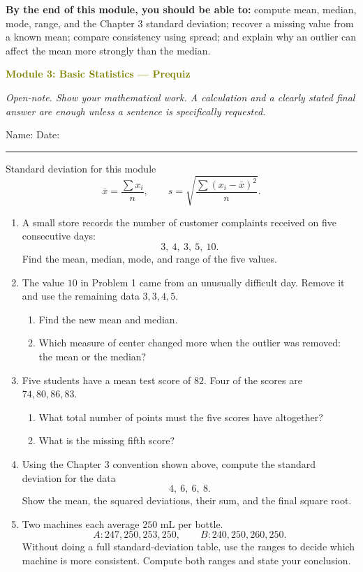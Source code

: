 \documentclass[11pt]{article}
\newcommand{\prequizhead}[2]{%
  \clearpage
  {\Large\bfseries\textcolor{olive}{Module #1: #2 — Prequiz}}\par
  \textit{Open-note. Show your mathematical work. A calculation and a clearly stated final answer are enough unless a sentence is specifically requested.}\par
  Name: \hspace{2.6in} Date: \hspace{1.1in}\par
  \vspace{2pt}\textcolor{gold}{\rule{\linewidth}{1.2pt}}\par\smallskip
}
\newcommand{\worklarge}{\par\vspace{0.92in}}
\newcommand{\workxl}{\par\vspace{1.22in}}
\begin{document}
\textbf{By the end of this module, you should be able to:} compute mean, median, mode, range, and the Chapter 3 standard deviation; recover a missing value from a known mean; compare consistency using spread; and explain why an outlier can affect the mean more strongly than the median.

\prequizhead{3}{Basic Statistics}
\begin{refbox}{Standard deviation for this module}
\[
\bar x=\frac{\sum x_i}{n},
\qquad
s=\sqrt{\frac{\sum (x_i-\bar x)^2}{n}}.
\]
\end{refbox}

\begin{enumerate}
\item A small store records the number of customer complaints received on five consecutive days:
\[
3,\ 4,\ 3,\ 5,\ 10.
\]
Find the mean, median, mode, and range of the five values.
\workxl

\item The value \(10\) in Problem 1 came from an unusually difficult day. Remove it and use the remaining data \(3,3,4,5\).
\begin{enumerate}[label=(\alph*),itemsep=4pt]
\item Find the new mean and median.
\item Which measure of center changed more when the outlier was removed: the mean or the median?
\end{enumerate}
\worklarge

\item Five students have a mean test score of \(82\). Four of the scores are \(74,80,86,83\).
\begin{enumerate}[label=(\alph*),itemsep=4pt]
\item What total number of points must the five scores have altogether?
\item What is the missing fifth score?
\end{enumerate}
\worklarge

\item Using the Chapter 3 convention shown above, compute the standard deviation for the data
\[
4,\ 6,\ 6,\ 8.
\]
Show the mean, the squared deviations, their sum, and the final square root.
\workxl

\item Two machines each average \(250\) mL per bottle.
\[
A:247,250,253,250,
\qquad
B:240,250,260,250.
\]
Without doing a full standard-deviation table, use the ranges to decide which machine is more consistent. Compute both ranges and state your conclusion.
\worklarge
\end{enumerate}
\end{document}
